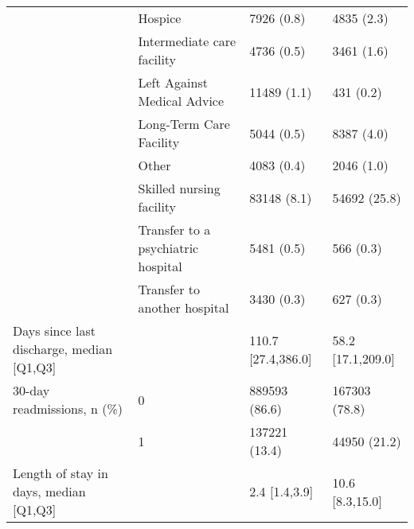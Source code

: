 \begin{tabular}{llll}
                                       & Hospice &                            7926 (0.8) &         4835 (2.3) \\
                                       & Intermediate care facility &                            4736 (0.5) &         3461 (1.6) \\
                                       & Left Against Medical Advice &                           11489 (1.1) &          431 (0.2) \\
                                       & Long-Term Care Facility &                            5044 (0.5) &         8387 (4.0) \\
                                       & Other &                            4083 (0.4) &         2046 (1.0) \\
                                       & Skilled nursing facility &                           83148 (8.1) &       54692 (25.8) \\
                                       & Transfer to a psychiatric hospital &                            5481 (0.5) &          566 (0.3) \\
                                       & Transfer to another hospital &                            3430 (0.3) &          627 (0.3) \\
Days since last discharge, median [Q1,Q3] &   &                    110.7 [27.4,386.0] &  58.2 [17.1,209.0] \\
30-day readmissions, n (\%) & 0 &                         889593 (86.6) &      167303 (78.8) \\
                                       & 1 &                         137221 (13.4) &       44950 (21.2) \\
Length of stay in days, median [Q1,Q3] &   &                         2.4 [1.4,3.9] &    10.6 [8.3,15.0] \\
\bottomrule
\end{tabular}
